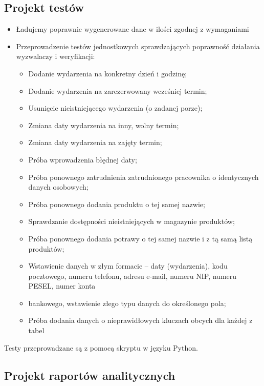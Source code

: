 \documentclass[12pt]{article}
\begin{document}
\subsection{Projekt testów}
\begin{itemize}
    \item Ładujemy poprawnie wygenerowane dane w ilości zgodnej z wymaganiami
    \item Przeprowadzenie testów jednostkowych sprawdzających poprawność działania wyzwalaczy i weryfikacji:
        \begin{itemize}
            \item Dodanie wydarzenia na konkretny dzień i godzinę;
            \item Dodanie wydarzenia na zarezerwowany wcześniej termin;
            \item Usunięcie nieistniejącego wydarzenia (o zadanej porze);
            \item Zmiana daty wydarzenia na inny, wolny termin;
            \item Zmiana daty wydarzenia na zajęty termin;
            \item Próba wprowadzenia błędnej daty;
            \item Próba ponownego zatrudnienia zatrudnionego pracownika o identycznych danych osobowych;
            \item Próba ponownego dodania produktu o tej samej nazwie;
            \item Sprawdzanie dostępności nieistniejących w magazynie produktów;
            \item Próba ponownego dodania potrawy o tej samej nazwie i z tą samą listą produktów;
            \item Wstawienie danych w złym formacie – daty (wydarzenia), kodu pocztowego, numeru telefonu, adresu e-mail, numeru NIP, numeru PESEL, numer konta\item bankowego, wstawienie złego typu danych do określonego pola;
            \item Próba dodania danych o nieprawidłowych kluczach obcych dla każdej z tabel
        \end{itemize}
\end{itemize}
 
Testy przeprowadzane są z pomocą skryptu w języku Python.

\subsection{Projekt raportów analitycznych}
\end{document}
